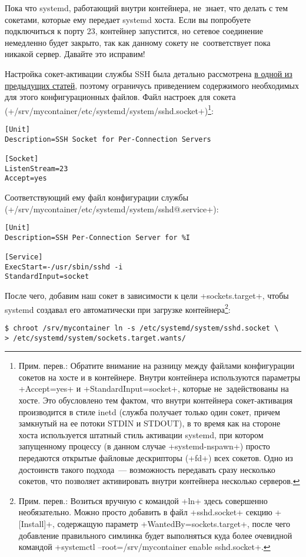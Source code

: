 \documentclass[10pt,oneside,a4paper]{article}
\begin{document}
Пока что systemd, работающий внутри контейнера, не~знает, что делать с тем
сокетами, которые ему передает systemd хоста. Если вы попробуете подключиться к
порту 23, контейнер запустится, но сетевое соединение немедленно будет закрыто,
так как данному сокету не~соответствует пока никакой сервер. Давайте это
исправим!

Настройка сокет-активации службы SSH была детально рассмотрена 
\hyperref[sec:inetd]{в одной из предыдущих статей}, поэтому ограничусь
приведением содержимого необходимых для этого конфигурационных файлов. Файл
настроек для сокета
(+/srv/mycontainer/etc/systemd/system/sshd.socket+)\footnote{Прим. перев.:
Обратите внимание на разницу между файлами конфигурации сокетов на хосте и
в контейнере. Внутри контейнера используются параметры +Accept=yes+ и
+StandardInput=socket+, которые не~задействованы на хосте. Это обусловлено тем
фактом, что внутри контейнера сокет-активация производится в стиле inetd (служба
получает только один сокет, причем замкнутый на ее потоки STDIN и STDOUT), в то
время как на стороне хоста используется штатный стиль активации systemd, при
котором запущенному процессу (в данном случае +systemd-nspawn+) просто
передаются открытые файловые дескрипторы (+fd+) всех сокетов. Одно из достоинств
такого подхода~--- возможность передавать сразу несколько сокетов, что позволяет
активировать внутри контейнера несколько серверов.}:
\begin{Verbatim}
[Unit]
Description=SSH Socket for Per-Connection Servers

[Socket]
ListenStream=23
Accept=yes
\end{Verbatim}

Соответствующий ему файл конфигурации службы \\
(+/srv/mycontainer/etc/systemd/system/sshd@.service+):
\begin{Verbatim}
[Unit]
Description=SSH Per-Connection Server for %I

[Service]
ExecStart=-/usr/sbin/sshd -i
StandardInput=socket
\end{Verbatim}

После чего, добавим наш сокет в зависимости к цели +sockets.target+, чтобы
systemd создавал его автоматически при загрузке контейнера\footnote{Прим.
перев.: Возиться вручную с командой +ln+ здесь совершенно необязательно. Можно
просто добавить в файл +sshd.socket+ секцию +[Install]+, содержащую параметр
+WantedBy=sockets.target+, после чего добавление правильного симлинка будет
выполняться куда более очевидной командой
+systemctl --root=/srv/mycontainer enable sshd.socket+.}:
\begin{Verbatim}
$ chroot /srv/mycontainer ln -s /etc/systemd/system/sshd.socket \
> /etc/systemd/system/sockets.target.wants/
\end{Verbatim}
\end{document}
